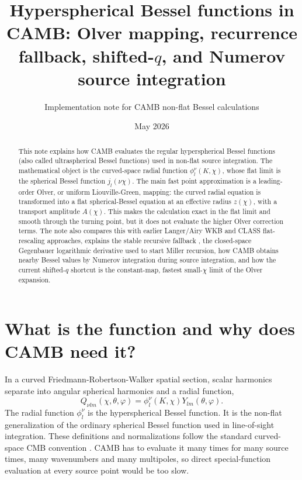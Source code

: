 \documentclass[11pt,a4paper]{article}
\title{Hyperspherical Bessel functions in CAMB: Olver mapping, recurrence fallback, shifted-\(q\), and Numerov source integration}
\author{Implementation note for CAMB non-flat Bessel calculations}
\date{May 2026}
\newcommand{\code}[1]{\texttt{\detokenize{#1}}}
\begin{document}
\sloppy
\maketitle

\begin{abstract}
This note explains how CAMB evaluates the regular hyperspherical Bessel functions (also called ultraspherical Bessel functions) used in non-flat source integration.  The mathematical object is the curved-space radial function \(\phi_l^\nu(K,\chi)\), whose flat limit is the spherical Bessel function \(j_l(\nu\chi)\).  The main fast point approximation is a leading-order Olver, or uniform Liouville-Green, mapping: the curved radial equation is transformed into a flat spherical-Bessel equation at an effective radius \(z(\chi)\), with a transport amplitude \(A(\chi)\).  This makes the calculation exact in the flat limit and smooth through the turning point, but it does not evaluate the higher Olver correction terms.  The note also compares this with earlier Langer/Airy WKB and \textsc{CLASS} flat-rescaling approaches, explains the stable recursive fallback \code{phi_recurs}, the closed-space Gegenbauer logarithmic derivative used to start Miller recursion, how CAMB obtains nearby Bessel values by Numerov integration during source integration, and how the current shifted-\(q\) shortcut is the constant-map, fastest small-\(\chi\) limit of the Olver expansion.
\end{abstract}

\tableofcontents

\section{What is the function and why does CAMB need it?}

In a curved Friedmann-Robertson-Walker spatial section, scalar harmonics separate into angular spherical harmonics and a radial function,
\begin{equation}
  Q_{\nu lm}(\chi,\theta,\varphi)=\phi_l^\nu(K,\chi)Y_{lm}(\theta,\varphi).
\end{equation}
The radial function \(\phi_l^\nu\) is the hyperspherical Bessel function.  It is the non-flat generalization of the ordinary spherical Bessel function used in line-of-sight integration.  These definitions and normalizations follow the standard curved-space CMB convention \cite{abbott-schaefer,kosowsky1998,tram2013,lesgourgues-tram2013}.  CAMB has to evaluate it many times for many source times, many wavenumbers and many multipoles, so direct special-function evaluation at every source point would be too slow.
\end{document}
